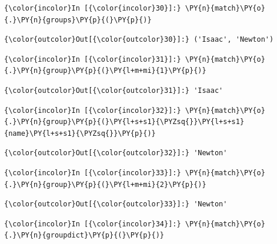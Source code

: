     \begin{Verbatim}[commandchars=\\\{\}]
{\color{incolor}In [{\color{incolor}30}]:} \PY{n}{match}\PY{o}{.}\PY{n}{groups}\PY{p}{(}\PY{p}{)}
\end{Verbatim}


\begin{Verbatim}[commandchars=\\\{\}]
{\color{outcolor}Out[{\color{outcolor}30}]:} ('Isaac', 'Newton')
\end{Verbatim}
            
    \begin{Verbatim}[commandchars=\\\{\}]
{\color{incolor}In [{\color{incolor}31}]:} \PY{n}{match}\PY{o}{.}\PY{n}{group}\PY{p}{(}\PY{l+m+mi}{1}\PY{p}{)}
\end{Verbatim}


\begin{Verbatim}[commandchars=\\\{\}]
{\color{outcolor}Out[{\color{outcolor}31}]:} 'Isaac'
\end{Verbatim}
            
    \begin{Verbatim}[commandchars=\\\{\}]
{\color{incolor}In [{\color{incolor}32}]:} \PY{n}{match}\PY{o}{.}\PY{n}{group}\PY{p}{(}\PY{l+s+s1}{\PYZsq{}}\PY{l+s+s1}{name}\PY{l+s+s1}{\PYZsq{}}\PY{p}{)}
\end{Verbatim}


\begin{Verbatim}[commandchars=\\\{\}]
{\color{outcolor}Out[{\color{outcolor}32}]:} 'Newton'
\end{Verbatim}
            
    \begin{Verbatim}[commandchars=\\\{\}]
{\color{incolor}In [{\color{incolor}33}]:} \PY{n}{match}\PY{o}{.}\PY{n}{group}\PY{p}{(}\PY{l+m+mi}{2}\PY{p}{)}
\end{Verbatim}


\begin{Verbatim}[commandchars=\\\{\}]
{\color{outcolor}Out[{\color{outcolor}33}]:} 'Newton'
\end{Verbatim}
            
    \begin{Verbatim}[commandchars=\\\{\}]
{\color{incolor}In [{\color{incolor}34}]:} \PY{n}{match}\PY{o}{.}\PY{n}{groupdict}\PY{p}{(}\PY{p}{)}
\end{Verbatim}


